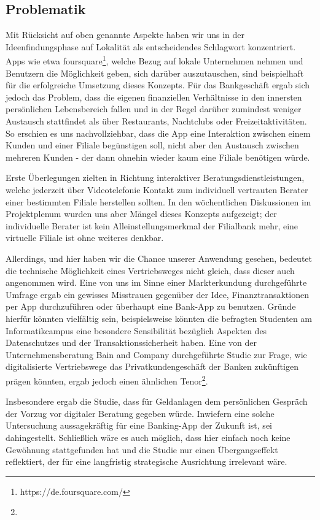 
\subsection{Problematik}
Mit Rücksicht auf oben genannte Aspekte haben wir uns in der Ideenfindungsphase auf Lokalität als entscheidendes Schlagwort konzentriert. Apps wie etwa foursquare\footnote{https://de.foursquare.com/}, welche Bezug auf lokale Unternehmen nehmen und Benutzern die Möglichkeit geben, sich darüber auszutauschen, sind beispielhaft für die erfolgreiche Umsetzung dieses Konzepts. Für das Bankgeschäft ergab sich jedoch das Problem, dass die eigenen finanziellen Verhältnisse in den innersten persönlichen Lebensbereich fallen und in der Regel darüber zumindest weniger Austausch stattfindet als über Restaurants, Nachtclubs oder Freizeitaktivitäten. So erschien es uns nachvollziehbar, dass die App eine Interaktion zwischen einem Kunden und einer Filiale begünstigen soll, nicht aber den Austausch zwischen mehreren Kunden - der dann ohnehin wieder kaum eine Filiale benötigen würde.

Erste Überlegungen zielten in Richtung interaktiver Beratungsdienstleistungen, welche jederzeit über Videotelefonie Kontakt zum individuell vertrauten Berater einer bestimmten Filiale herstellen sollten. In den wöchentlichen Diskussionen im Projektplenum wurden uns aber Mängel dieses Konzepts aufgezeigt; der individuelle Berater ist kein Alleinstellungsmerkmal der Filialbank mehr, eine virtuelle Filiale ist ohne weiteres denkbar.

Allerdings, und hier haben wir die Chance unserer Anwendung gesehen, bedeutet die technische Möglichkeit eines Vertriebsweges nicht gleich, dass dieser auch angenommen wird. Eine von uns im Sinne einer Markterkundung durchgeführte Umfrage ergab ein gewisses Misstrauen gegenüber der Idee, Finanztransaktionen per App durchzuführen oder  überhaupt eine Bank-App zu benutzen. Gründe hierfür könnten vielfältig sein, beispielsweise könnten die befragten Studenten am Informatikcampus eine besondere Sensibilität bezüglich Aspekten des Datenschutzes und der Transaktionssicherheit haben. Eine von der Unternehmensberatung Bain and Company durchgeführte Studie zur Frage, wie digitalisierte Vertriebswege das Privatkundengeschäft der Banken zukünftigen prägen könnten, ergab jedoch einen ähnlichen Tenor\footnote{%
}.

 Insbesondere ergab die Studie, dass für Geldanlagen dem persönlichen Gespräch der Vorzug vor digitaler Beratung gegeben würde. Inwiefern eine solche Untersuchung aussagekräftig für eine Banking-App der Zukunft ist, sei dahingestellt. Schließlich wäre es auch möglich, dass hier einfach noch keine Gewöhnung stattgefunden hat und die Studie nur einen Übergangseffekt reflektiert, der für eine langfristig strategische Ausrichtung irrelevant wäre. 
 
